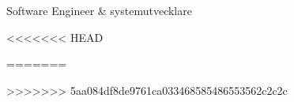 \documentclass[]{friggeri-cv/friggeri-cv}
\begin{document}
{Software Engineer \& systemutvecklare}
      

<<<<<<< HEAD



\newpage

=======

>>>>>>> 5aa084df8de9761ca033468585486553562c2c2c
\end{document}
